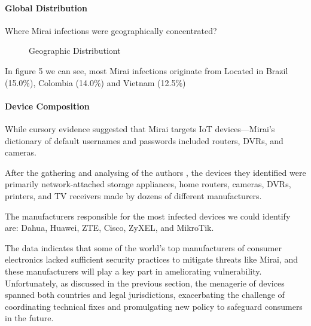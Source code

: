 \documentclass[conference]{IEEEtran}
\begin{document}
\paragraph{\textbf{Global Distribution}}
Where Mirai infections were geographically
concentrated?

\begin{figure}[htbp]
\caption{Geographic Distributiont\cite{b1}}
\label{fig}
\end{figure}

In figure 5 we can see, most Mirai infections originate from
Located in Brazil (15.0\%), Colombia (14.0\%) and
Vietnam (12.5\%)

\paragraph{\textbf{Device Composition}}

While cursory evidence suggested that Mirai targets IoT
devices—Mirai’s dictionary of default usernames and
passwords included routers, DVRs, and cameras.

After the gathering and analysing of the authors \cite{b1}, the devices they identified were primarily
network-attached storage appliances, home routers, cameras,
DVRs, printers, and TV receivers made by dozens
of different manufacturers.

The manufacturers responsible
for the most infected devices we could identify are:
Dahua, Huawei, ZTE, Cisco, ZyXEL, and MikroTik.

The data indicates that some of the world’s top manufacturers
of consumer electronics lacked sufficient security
practices to mitigate threats like Mirai, and these
manufacturers will play a key part in ameliorating vulnerability.
Unfortunately, as discussed in the previous
section, the menagerie of devices spanned both countries
and legal jurisdictions, exacerbating the challenge of coordinating
technical fixes and promulgating new policy to
safeguard consumers in the future.
\end{document}
